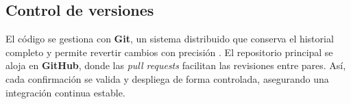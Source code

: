 \subsection{Control de versiones}

\begin{large}

El código se gestiona con \textbf{Git}, un sistema distribuido que conserva el historial completo y permite revertir cambios con precisión \cite{git_book2023}. El repositorio principal se aloja en \textbf{GitHub}, donde las \emph{pull requests} facilitan las revisiones entre pares. Así, cada confirmación se valida y despliega de forma controlada, asegurando una integración continua estable.

\end{large}
